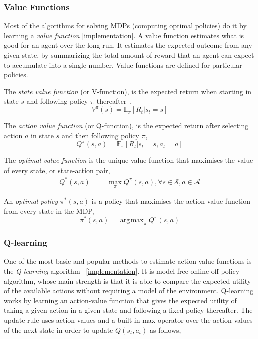 \documentclass{article}
\DeclareMathOperator*{\argmax}{\arg\!\max}
\newcommand{\GithubURL}[1]{[\href{https://github.com/davidrobles/mlnd-capstone-code/blob/master/#1}{implementation}]}
\begin{document}
\subsubsection{Value Functions}

Most of the algorithms for solving MDPs (computing optimal policies) do it by learning a \emph{value
function} \GithubURL{capstone/rl/value_function.py}. A value function estimates what is good for an
agent over the long run. It estimates the expected outcome from any given state, by summarizing the
total amount of reward that an agent can expect to accumulate into a single number. Value functions
are defined for particular policies.

The \emph{state value function} (or V-function), is the expected return when starting in state $s$
and following policy $\pi$ thereafter~\citep{Sutton1998RL},
%
\begin{equation}
V^\pi(s) = \mathbb{E}_\pi \left[R_t | s_t = s \right]
\end{equation}

The \emph{action value function} (or Q-function), is the expected return after selecting action $a$
in state $s$ and then following policy $\pi$,
%
\begin{equation}
Q^\pi(s,a) = \mathbb{E}_\pi \left[ R_t | s_t = s, a_t = a \right]
\end{equation}

The \emph{optimal value function} is the unique value function that maximises the value of every
state, or state-action pair,
%
\begin{eqnarray}
Q^*(s,a) & = & \max\limits_\pi Q^\pi(s,a), \forall s \in \mathcal{S}, a \in \mathcal{A}
\end{eqnarray}

An \emph{optimal policy} $\pi^*(s,a)$ is a policy that maximises the action value function from
every state in the MDP,
%
\begin{equation}
    \pi^*(s,a) = \argmax_\pi Q^\pi(s, a)
\end{equation}

\subsubsection{Q-learning}

One of the most basic and popular methods to estimate action-value functions is the
\emph{Q-learning} algorithm~\citep{Watkins1989PhD} \GithubURL{capstone/rl/learners/qlearning.py}.
It is model-free online off-policy algorithm, whose main strength is that it is able to compare the
expected utility of the available actions without requiring a model of the environment. Q-learning
works by learning an action-value function that gives the expected utility of taking a given action
in a given state and following a fixed policy thereafter. The update rule uses action-values and a
built-in max-operator over the action-values of the next state in order to update $Q(s_t, a_t)$ as
follows,
\end{document}
